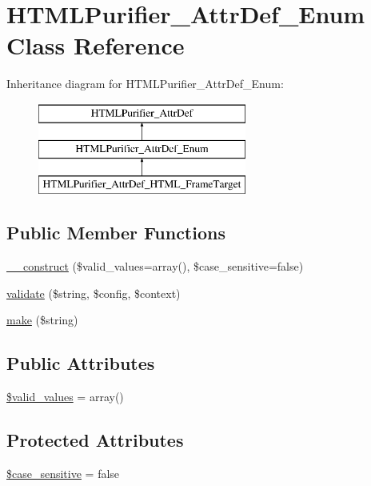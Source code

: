 \hypertarget{classHTMLPurifier__AttrDef__Enum}{\section{H\+T\+M\+L\+Purifier\+\_\+\+Attr\+Def\+\_\+\+Enum Class Reference}
\label{classHTMLPurifier__AttrDef__Enum}
}
Inheritance diagram for H\+T\+M\+L\+Purifier\+\_\+\+Attr\+Def\+\_\+\+Enum\+:\begin{figure}[H]
\begin{center}
\leavevmode
\includegraphics[height=3.000000cm]{classHTMLPurifier__AttrDef__Enum}
\end{center}
\end{figure}
\subsection*{Public Member Functions}
\begin{DoxyCompactItemize}
\item 
\hyperlink{classHTMLPurifier__AttrDef__Enum_ab754e65c8301c2e6c33e8698d2c81ef0}{\+\_\+\+\_\+construct} (\$valid\+\_\+values=array(), \$case\+\_\+sensitive=false)
\item 
\hyperlink{classHTMLPurifier__AttrDef__Enum_abd19eb5ae772435d88664e53aa6900ab}{validate} (\$string, \$config, \$context)
\item 
\hyperlink{classHTMLPurifier__AttrDef__Enum_ab2992164766fee262e6f60db84635456}{make} (\$string)
\end{DoxyCompactItemize}
\subsection*{Public Attributes}
\begin{DoxyCompactItemize}
\item 
\hyperlink{classHTMLPurifier__AttrDef__Enum_abc1df45b8d1bb628e037beae48b951d4}{\$valid\+\_\+values} = array()
\end{DoxyCompactItemize}
\subsection*{Protected Attributes}
\begin{DoxyCompactItemize}
\item 
\hyperlink{classHTMLPurifier__AttrDef__Enum_a146fbbbb149091688e54c1772a7713ac}{\$case\+\_\+sensitive} = false
\end{DoxyCompactItemize}

